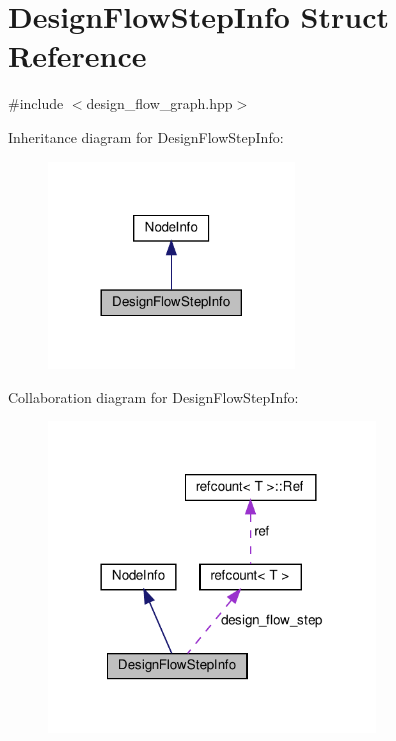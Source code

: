 \hypertarget{structDesignFlowStepInfo}{}\section{Design\+Flow\+Step\+Info Struct Reference}
\label{structDesignFlowStepInfo}


{\ttfamily \#include $<$design\+\_\+flow\+\_\+graph.\+hpp$>$}



Inheritance diagram for Design\+Flow\+Step\+Info\+:
\nopagebreak
\begin{figure}[H]
\begin{center}
\leavevmode
\includegraphics[width=185pt]{de/d98/structDesignFlowStepInfo__inherit__graph}
\end{center}
\end{figure}


Collaboration diagram for Design\+Flow\+Step\+Info\+:
\nopagebreak
\begin{figure}[H]
\begin{center}
\leavevmode
\includegraphics[width=246pt]{d8/df0/structDesignFlowStepInfo__coll__graph}
\end{center}
\end{figure}
